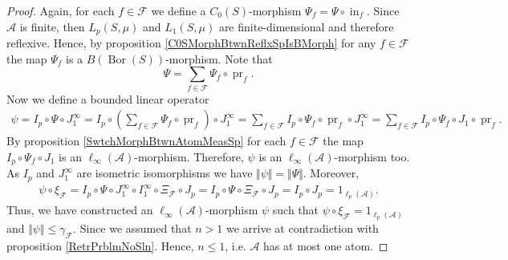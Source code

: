 \documentclass[12pt]{article}
\begin{document}
\begin{proof}
    Again, for each $f\in\mathcal{F}$ we define 
    a $C_0(S)$-morphism $\Psi_f=\Psi\circ \operatorname{in}_f$. 
    Since $\mathcal{A}$ is finite, then $L_p(S,\mu)$ and $L_1(S,\mu)$ are
    finite-dimensional and therefore reflexive. Hence, by 
    proposition \ref{C0SMorphBtwnReflxSpIsBMorph} for any $f\in\mathcal{F}$ the
    map $\Psi_f$ is a $B(\operatorname{Bor}(S))$-morphism. Note that
    \[
        \Psi=\sum_{f\in\mathcal{F}} \Psi_f\circ\operatorname{pr}_f.
    \]
    Now we define a bounded linear operator
    \[
    \begin{aligned}
        \psi
        =I_p\circ\Psi\circ J_1^\infty
        =I_p\circ\left(
            \sum_{f\in\mathcal{F}} \Psi_f\circ \operatorname{pr}_f
        \right)\circ J_1^\infty 
        =\sum_{f\in\mathcal{F}} 
            I_p\circ\Psi_f\circ\operatorname{pr}_f\circ J_1^\infty 
        =\sum_{f\in\mathcal{F}} 
            I_p\circ\Psi_f\circ J_1\circ\operatorname{pr}_f.
    \end{aligned} 
    \]
    By proposition \ref{SwtchMorphBtwnAtomMeasSp} for each $f\in \mathcal{F}$ 
    the map $I_p\circ \Psi_f\circ J_1$ is 
    an $\ell_\infty(\mathcal{A})$-morphism. Therefore, $\psi$ is 
    an $\ell_\infty(\mathcal{A})$-morphism too. As $I_p$ and $J_1^{\infty}$ are
    isometric isomorphisms we have $\Vert\psi\Vert=\Vert\Psi\Vert$. Moreover,
    \[
    \begin{aligned}
        \psi\circ\xi_\mathcal{F}
        = I_p\circ\Psi\circ J_1^{\infty}\circ 
            I_1^{\infty}\circ \Xi_{\mathcal{F}}\circ J_p
        = I_p\circ\Psi\circ \Xi_{\mathcal{F}}\circ J_p
        = I_p\circ J_p
        = 1_{\ell_p(\mathcal{A})}.
    \end{aligned}
    \]
    Thus, we have constructed an $\ell_\infty(\mathcal{A})$-morphism $\psi$
    such that $\psi\circ\xi_{\mathcal{F}}=1_{\ell_p(\mathcal{A})}$ 
    and $\Vert \psi\Vert\leq\gamma_{\mathcal{F}}$. Since we assumed that $n>1$
    we arrive at contradiction with proposition \ref{RetrPrblmNoSln}. 
    Hence, $n\leq 1$, i.e. $\mathcal{A}$ has at most one atom.
\end{proof}
\end{document}
